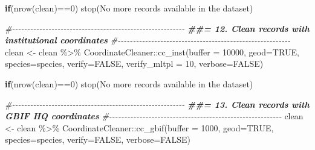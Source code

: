 \documentclass[
]{article}
\newenvironment{Shaded}{\begin{snugshade}}{\end{snugshade}}
\newcommand{\AttributeTok}[1]{\textcolor[rgb]{0.77,0.63,0.00}{#1}}
\newcommand{\CommentTok}[1]{\textcolor[rgb]{0.56,0.35,0.01}{\textit{#1}}}
\newcommand{\ConstantTok}[1]{\textcolor[rgb]{0.00,0.00,0.00}{#1}}
\newcommand{\ControlFlowTok}[1]{\textcolor[rgb]{0.13,0.29,0.53}{\textbf{#1}}}
\newcommand{\DecValTok}[1]{\textcolor[rgb]{0.00,0.00,0.81}{#1}}
\newcommand{\DocumentationTok}[1]{\textcolor[rgb]{0.56,0.35,0.01}{\textbf{\textit{#1}}}}
\newcommand{\FunctionTok}[1]{\textcolor[rgb]{0.00,0.00,0.00}{#1}}
\newcommand{\NormalTok}[1]{#1}
\newcommand{\OtherTok}[1]{\textcolor[rgb]{0.56,0.35,0.01}{#1}}
\newcommand{\SpecialCharTok}[1]{\textcolor[rgb]{0.00,0.00,0.00}{#1}}
\newcommand{\StringTok}[1]{\textcolor[rgb]{0.31,0.60,0.02}{#1}}
\begin{document}
\begin{Shaded}
\begin{Highlighting}[]
\ControlFlowTok{if}\NormalTok{(}\FunctionTok{nrow}\NormalTok{(clean)}\SpecialCharTok{==}\DecValTok{0}\NormalTok{) }\FunctionTok{stop}\NormalTok{(}\StringTok{\textquotesingle{}No more records available in the dataset\textquotesingle{}}\NormalTok{)}

\CommentTok{\#{-}{-}{-}{-}{-}{-}{-}{-}{-}{-}{-}{-}{-}{-}{-}{-}{-}{-}{-}{-}{-}{-}{-}{-}{-}{-}{-}{-}{-}{-}{-}{-}{-}{-}{-}{-}{-}{-}{-}{-}{-}{-}{-}{-}{-}{-}{-}{-}{-}{-}{-}{-}{-}{-}{-}{-}{-}}
\DocumentationTok{\#\#= 12. Clean records with institutional coordinates}
\CommentTok{\#{-}{-}{-}{-}{-}{-}{-}{-}{-}{-}{-}{-}{-}{-}{-}{-}{-}{-}{-}{-}{-}{-}{-}{-}{-}{-}{-}{-}{-}{-}{-}{-}{-}{-}{-}{-}{-}{-}{-}{-}{-}{-}{-}{-}{-}{-}{-}{-}{-}{-}{-}{-}{-}{-}{-}{-}{-}}
\NormalTok{clean }\OtherTok{\textless{}{-}}\NormalTok{ clean }\SpecialCharTok{\%\textgreater{}\%}
\NormalTok{  CoordinateCleaner}\SpecialCharTok{::}\FunctionTok{cc\_inst}\NormalTok{(}\AttributeTok{buffer =} \DecValTok{10000}\NormalTok{,}
                             \AttributeTok{geod=}\ConstantTok{TRUE}\NormalTok{,}
                             \AttributeTok{species=}\StringTok{\textquotesingle{}species\textquotesingle{}}\NormalTok{,}
                             \AttributeTok{verify=}\ConstantTok{FALSE}\NormalTok{,}
                             \AttributeTok{verify\_mltpl =} \DecValTok{10}\NormalTok{,}
                             \AttributeTok{verbose=}\ConstantTok{FALSE}\NormalTok{)}

\ControlFlowTok{if}\NormalTok{(}\FunctionTok{nrow}\NormalTok{(clean)}\SpecialCharTok{==}\DecValTok{0}\NormalTok{) }\FunctionTok{stop}\NormalTok{(}\StringTok{\textquotesingle{}No more records available in the dataset\textquotesingle{}}\NormalTok{)}

\CommentTok{\#{-}{-}{-}{-}{-}{-}{-}{-}{-}{-}{-}{-}{-}{-}{-}{-}{-}{-}{-}{-}{-}{-}{-}{-}{-}{-}{-}{-}{-}{-}{-}{-}{-}{-}{-}{-}{-}{-}{-}{-}{-}{-}{-}{-}{-}{-}{-}{-}{-}{-}{-}{-}{-}{-}{-}{-}{-}}
\DocumentationTok{\#\#= 13. Clean records with GBIF HQ coordinates}
\CommentTok{\#{-}{-}{-}{-}{-}{-}{-}{-}{-}{-}{-}{-}{-}{-}{-}{-}{-}{-}{-}{-}{-}{-}{-}{-}{-}{-}{-}{-}{-}{-}{-}{-}{-}{-}{-}{-}{-}{-}{-}{-}{-}{-}{-}{-}{-}{-}{-}{-}{-}{-}{-}{-}{-}{-}{-}{-}{-}}
\NormalTok{clean }\OtherTok{\textless{}{-}}\NormalTok{ clean }\SpecialCharTok{\%\textgreater{}\%}
\NormalTok{  CoordinateCleaner}\SpecialCharTok{::}\FunctionTok{cc\_gbif}\NormalTok{(}\AttributeTok{buffer =} \DecValTok{1000}\NormalTok{,}
                             \AttributeTok{geod=}\ConstantTok{TRUE}\NormalTok{,}
                             \AttributeTok{species=}\StringTok{\textquotesingle{}species\textquotesingle{}}\NormalTok{,}
                             \AttributeTok{verify=}\ConstantTok{FALSE}\NormalTok{,}
                             \AttributeTok{verbose=}\ConstantTok{FALSE}\NormalTok{)}


\end{Highlighting}
\end{Shaded}
\end{document}

